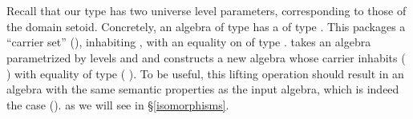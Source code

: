 \begin{code}%
\>[0]\<%
\\
\>[0]\AgdaSpace{}%
\AgdaSymbol{:}\AgdaSpace{}%
\AgdaSpace{}%
\AgdaSpace{}%
\AgdaSpace{}%
\AgdaSpace{}%
\AgdaSymbol{(}\AgdaSpace{}%
\AgdaSpace{}%
\AgdaSymbol{:}\AgdaSpace{}%
\AgdaSymbol{)}\AgdaSpace{}%
\AgdaSpace{}%
\AgdaSpace{}%
\AgdaSymbol{(}\AgdaSpace{}%
\AgdaSpace{}%
\AgdaSymbol{)}\AgdaSpace{}%
\AgdaSymbol{(}\AgdaSpace{}%
\AgdaSpace{}%
\AgdaSymbol{)}\<%
\end{code}
\ifshort
\vskip2mm
\else
\begin{code}%
\>[0]\AgdaSpace{}%
\AgdaSpace{}%
\AgdaSpace{}%
\AgdaSpace{}%
\AgdaSymbol{=}\AgdaSpace{}%
\AgdaSpace{}%
\AgdaSymbol{(}\AgdaSpace{}%
\AgdaSpace{}%
\AgdaSymbol{)}\AgdaSpace{}%
\<%
\\
\>[0]\<%
\end{code}
\fi
\noindent Recall that our  type has two universe level parameters, corresponding
to those of the domain setoid.
\ifshort\else
Concretely, an algebra of type    has a
 of type   . This packages a ``carrier set''
(), inhabiting  , with an equality on  of type
  .
\fi
{} takes an algebra parametrized by levels  and 
and constructs a new algebra whose
carrier inhabits  (  ) with equality of type 
 (  ). To be useful, this lifting operation should
result in an algebra with the same semantic properties as the input algebra, which is
indeed the case
\ifshort
(\qv).
\else
as we will see in §\ref{isomorphisms}.
\fi

